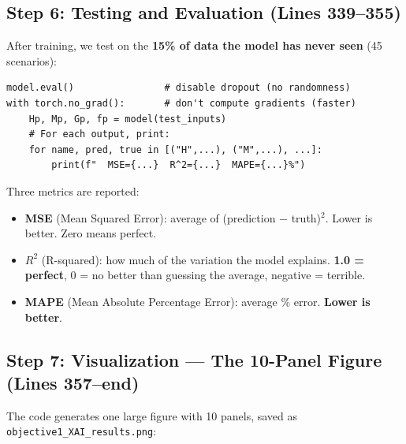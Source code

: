 \documentclass[11pt,a4paper]{article}
\begin{document}
\subsection{Step 6: Testing and Evaluation (Lines 339--355)}

After training, we test on the \textbf{15\% of data the model has
never seen} (45 scenarios):

\begin{lstlisting}
model.eval()                # disable dropout (no randomness)
with torch.no_grad():       # don't compute gradients (faster)
    Hp, Mp, Gp, fp = model(test_inputs)
    # For each output, print:
    for name, pred, true in [("H",...), ("M",...), ...]:
        print(f"  MSE={...}  R^2={...}  MAPE={...}%")
\end{lstlisting}

Three metrics are reported:
\begin{itemize}[nosep]
  \item \textbf{MSE} (Mean Squared Error): average of (prediction
        $-$ truth)$^2$.  Lower is better.  Zero means perfect.
  \item \textbf{$R^2$} (R-squared): how much of the variation the
        model explains.  \textbf{1.0 = perfect}, 0 = no better than
        guessing the average, negative = terrible.
  \item \textbf{MAPE} (Mean Absolute Percentage Error): average \%
        error.  \textbf{Lower is better}.
\end{itemize}


\subsection{Step 7: Visualization --- The 10-Panel Figure (Lines 357--end)}

The code generates one large figure with 10 panels, saved as
\texttt{objective1\_XAI\_results.png}:
\end{document}
